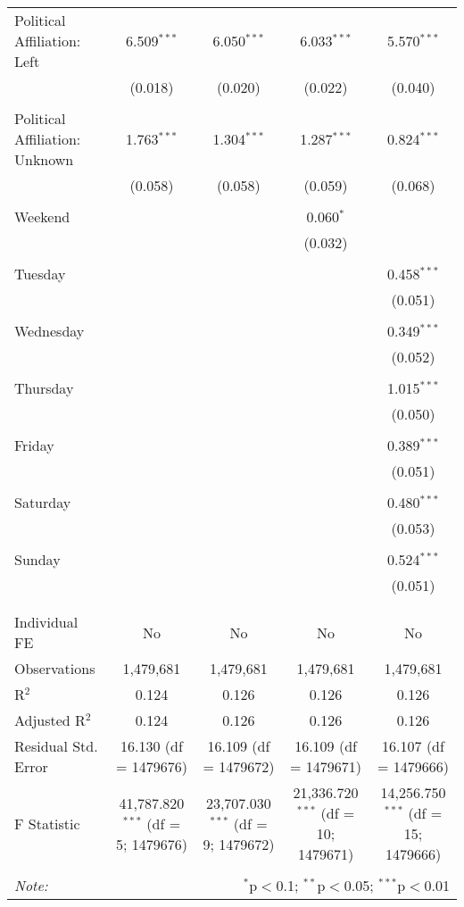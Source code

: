 \documentclass[
]{article}
\begin{document}
\begin{table}[!htbp]
{\begin{tabular}{@{\extracolsep{5pt}}lcccc}
 Political Affiliation: Left & 6.509$^{***}$ & 6.050$^{***}$ & 6.033$^{***}$ & 5.570$^{***}$ \\ 
  & (0.018) & (0.020) & (0.022) & (0.040) \\ 
  & & & & \\ 
 Political Affiliation: Unknown & 1.763$^{***}$ & 1.304$^{***}$ & 1.287$^{***}$ & 0.824$^{***}$ \\ 
  & (0.058) & (0.058) & (0.059) & (0.068) \\ 
  & & & & \\ 
 Weekend &  &  & 0.060$^{*}$ &  \\ 
  &  &  & (0.032) &  \\ 
  & & & & \\ 
 Tuesday &  &  &  & 0.458$^{***}$ \\ 
  &  &  &  & (0.051) \\ 
  & & & & \\ 
 Wednesday &  &  &  & 0.349$^{***}$ \\ 
  &  &  &  & (0.052) \\ 
  & & & & \\ 
 Thursday &  &  &  & 1.015$^{***}$ \\ 
  &  &  &  & (0.050) \\ 
  & & & & \\ 
 Friday &  &  &  & 0.389$^{***}$ \\ 
  &  &  &  & (0.051) \\ 
  & & & & \\ 
 Saturday &  &  &  & 0.480$^{***}$ \\ 
  &  &  &  & (0.053) \\ 
  & & & & \\ 
 Sunday &  &  &  & 0.524$^{***}$ \\ 
  &  &  &  & (0.051) \\ 
  & & & & \\ 
\hline \\[-1.8ex] 
Individual FE & No & No & No & No \\ 
Observations & 1,479,681 & 1,479,681 & 1,479,681 & 1,479,681 \\ 
R$^{2}$ & 0.124 & 0.126 & 0.126 & 0.126 \\ 
Adjusted R$^{2}$ & 0.124 & 0.126 & 0.126 & 0.126 \\ 
Residual Std. Error & 16.130 (df = 1479676) & 16.109 (df = 1479672) & 16.109 (df = 1479671) & 16.107 (df = 1479666) \\ 
F Statistic & 41,787.820$^{***}$ (df = 5; 1479676) & 23,707.030$^{***}$ (df = 9; 1479672) & 21,336.720$^{***}$ (df = 10; 1479671) & 14,256.750$^{***}$ (df = 15; 1479666) \\ 
\hline 
\hline \\[-1.8ex] 
\textit{Note:}  & \multicolumn{4}{r}{$^{*}$p$<$0.1; $^{**}$p$<$0.05; $^{***}$p$<$0.01} \\ 
\end{tabular}
} 
\end{table} 
\newpage
\end{document}
